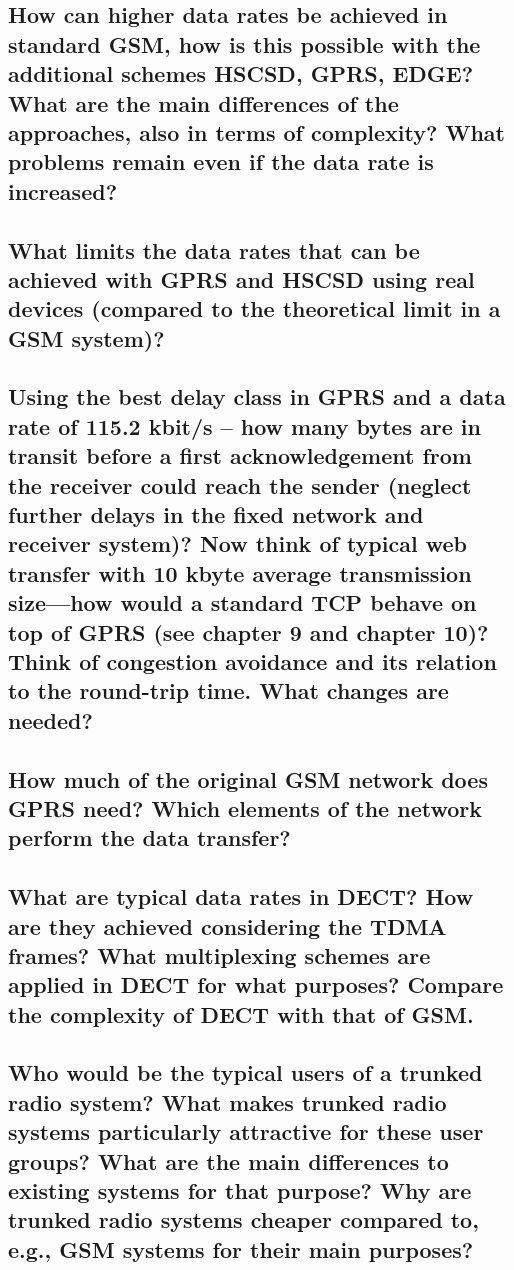 \subsection{How can higher data rates be achieved in standard GSM, how is this possible with
the additional schemes HSCSD, GPRS, EDGE? What are the main differences of the
approaches, also in terms of complexity? What problems remain even if the data rate
is increased?}

\subsection{What limits the data rates that can be achieved with GPRS and HSCSD using real
devices (compared to the theoretical limit in a GSM system)?}

\subsection{Using the best delay class in GPRS and a data rate of 115.2 kbit/s – how many bytes
are in transit before a first acknowledgement from the receiver could reach the sender
(neglect further delays in the fixed network and receiver system)? Now think of typical
web transfer with 10 kbyte average transmission size—how would a standard TCP
behave on top of GPRS (see chapter 9 and chapter 10)? Think of congestion
avoidance and its relation to the round-trip time. What changes are needed?}

\subsection{How much of the original GSM network does GPRS need? Which elements of the
network perform the data transfer?}

\subsection{What are typical data rates in DECT? How are they achieved considering the TDMA
frames? What multiplexing schemes are applied in DECT for what purposes?
Compare the complexity of DECT with that of GSM.}

\subsection{Who would be the typical users of a trunked radio system? What makes trunked radio
systems particularly attractive for these user groups? What are the main differences
to existing systems for that purpose? Why are trunked radio systems cheaper
compared to, e.g., GSM systems for their main purposes?}


